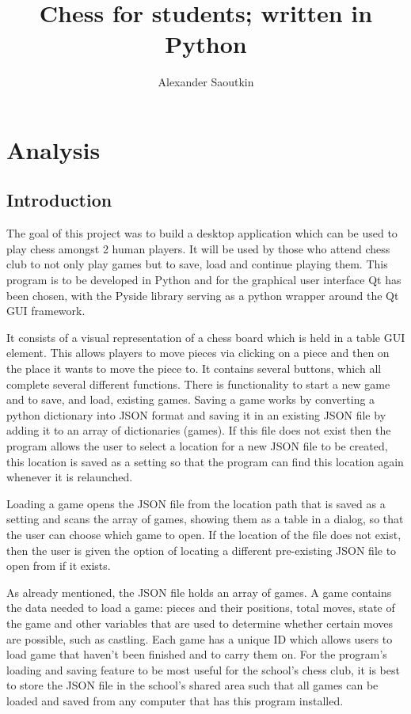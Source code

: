 \documentclass[]{report}
\title{Chess for students; written in Python}
\author{Alexander Saoutkin}
\begin{document}
\maketitle
{}
\tableofcontents
\newpage
\chapter{Analysis}
\section{Introduction}
The goal of this project was to build a desktop application which can be used to play chess amongst 2 human players. It will be used by those who attend chess club to not only play games but to save, load and continue playing them. This program is to be developed in Python and for the graphical user interface Qt has been chosen, with the Pyside library serving as a python wrapper around the Qt GUI framework. 

It consists of a visual representation of a chess board which is held in a table GUI element. This allows players to move pieces via clicking on a piece and then on the place it wants to move the piece to. It contains several buttons, which all complete several different functions. There is functionality to start a new game and to save, and load, existing games. Saving a game works by converting a python dictionary into JSON format and saving it in an existing JSON file by adding it to an array of dictionaries (games). If this file does not exist then the program allows the user to select a location for a new JSON file to be created, this location is saved as a setting so that the program can find this location again whenever it is relaunched.
 
Loading a game opens the JSON file from the location path that is saved as a setting and scans the array of games, showing them as a table in a dialog, so that the user can choose which game to open. If the location of the file does not exist, then the user is given the option of locating a different pre-existing JSON file to open from if it exists.

As already mentioned, the JSON file holds an array of games. A game contains the data needed to load a game: pieces and their positions, total moves, state of the game and other variables that are used to determine whether certain moves are possible, such as castling. Each game has a unique ID which allows users to load game that haven’t been finished and to carry them on. For the program’s loading and saving feature to be most useful for the school’s chess club, it is best to store the JSON file in the school’s shared area such that all games can be loaded and saved from any computer that has this program installed.
\end{document}
